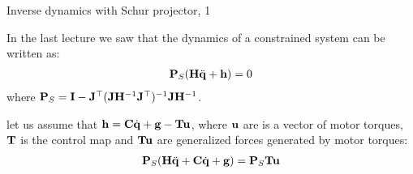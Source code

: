 \documentclass{beamer}
\begin{document}
%		
%		
%			
%			
%		



\begin{frame}{Inverse dynamics with Schur projector, 1}
	\begin{flushleft}
		
In the last lecture we saw that the dynamics of a constrained system can be written as: 
%
\begin{align}
	\mathbf{P}_S(\mathbf{H}\ddot{\mathbf{q}}+\mathbf{h})=0
\end{align}
%
where $\mathbf{P}_S = 
\mathbf{I}-\mathbf{J}^\top ( \mathbf{J} \mathbf{H}^{-1} \mathbf{J}^\top )^{-1} \mathbf{J} \mathbf{H}^{-1}$.

\bigskip

let us assume that $\mathbf{h} = \mathbf{C}\dot{\mathbf{q}} + \mathbf{g} - \mathbf{T}\mathbf{u}$, where $\mathbf{u}$ are is a vector of motor torques, $\mathbf{T}$ is the control map and $\mathbf{T}\mathbf{u}$ are generalized forces generated by motor torques:
%
\begin{align}
	\mathbf{P}_S(\mathbf{H}\ddot{\mathbf{q}} + \mathbf{C}\dot{\mathbf{q}}+ \mathbf{g}) = \mathbf{P}_S\mathbf{T}\mathbf{u}
\end{align}
		
		
	\end{flushleft}
\end{frame}
\end{document}
